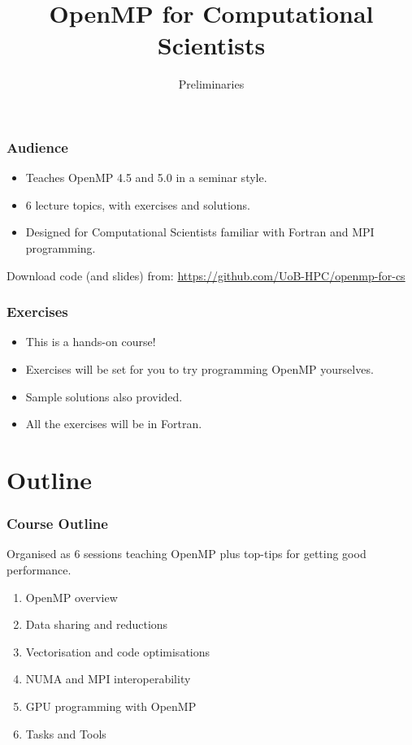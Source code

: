 \documentclass{beamer}
\title{OpenMP for Computational Scientists}
\subtitle{Preliminaries}
\begin{document}
\frame{\titlepage}

\begin{frame}
\frametitle{Audience}

\begin{itemize}
\item Teaches OpenMP 4.5 and 5.0 in a seminar style.
\item 6 lecture topics, with exercises and solutions.
\item Designed for Computational Scientists familiar with Fortran and MPI programming.

\end{itemize}

Download code (and slides) from:
\url{https://github.com/UoB-HPC/openmp-for-cs}

\end{frame}

\begin{frame}
\frametitle{Exercises}
\begin{itemize}
\item This is a hands-on course!
\item Exercises will be set for you to try programming OpenMP yourselves.
\item Sample solutions also provided.
\item All the exercises will be in Fortran.
\end{itemize}

\end{frame}

\section{Outline}
\begin{frame}
\frametitle{Course Outline}
Organised as 6 sessions teaching OpenMP plus top-tips for getting good performance.
\begin{enumerate}
  \item OpenMP overview
  \item Data sharing and reductions
  \item Vectorisation and code optimisations
  \item NUMA and MPI interoperability
  \item GPU programming with OpenMP
  \item Tasks and Tools
\end{enumerate}
\end{frame}
\end{document}
